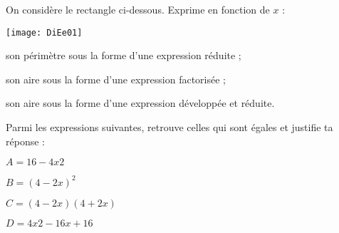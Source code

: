 \begin{exercice}[]
On considère le rectangle ci-dessous. Exprime en fonction de $x$ :

\begin{center}
    \texttt{[image: DiEe01]}
\end{center}

\begin{colenumerate}{1} 
\item son périmètre sous la forme d'une expression réduite ;
\item son aire sous la forme d'une expression factorisée ;
\item son aire sous la forme d'une expression développée et réduite.
\end{colenumerate} 
 
\end{exercice}

\begin{exercice}[]
Parmi les expressions suivantes, retrouve celles qui sont égales et justifie ta réponse :
\begin{colenumerate}{2}
\item $A = 16 -4x2$
\item $B = (4 -2x)^2$
\item $C = (4 -2x)(4 + 2x)$
\item $D = 4x2 -16x + 16$
\end{colenumerate}
\end{exercice}
